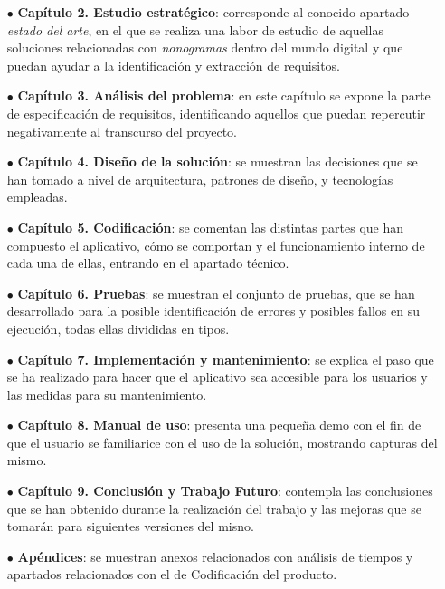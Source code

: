 \begin{itemize}
   \item[$\bullet$] \textbf{Capítulo 2. Estudio estratégico}: corresponde al conocido apartado \textit{estado del arte}, en el que se realiza una labor 
   de estudio de aquellas soluciones relacionadas con \textit{nonogramas} dentro del mundo digital y que puedan ayudar a la identificación y extracción de requisitos.
   \item[$\bullet$] \textbf{Capítulo 3. Análisis del problema}: en este capítulo se expone la parte de especificación de requisitos,
    identificando aquellos que puedan repercutir negativamente al transcurso del proyecto.
   \item[$\bullet$] \textbf{Capítulo 4. Diseño de la solución}: se muestran las decisiones que se han tomado a nivel de arquitectura, patrones de diseño, 
   y tecnologías empleadas.
   \item[$\bullet$] \textbf{Capítulo 5. Codificación}: se comentan las distintas partes que han compuesto el aplicativo, cómo se comportan y 
   el funcionamiento interno de cada una de ellas, entrando en el apartado técnico.
   \item[$\bullet$] \textbf{Capítulo 6. Pruebas}: se muestran el conjunto de pruebas, que se han desarrollado para la posible identificación de 
   errores y posibles fallos en su ejecución, todas ellas divididas en tipos. 
   \item[$\bullet$] \textbf{Capítulo 7. Implementación y mantenimiento}: se explica el paso que se ha realizado para hacer que el aplicativo sea accesible
   para los usuarios y las medidas para su mantenimiento. 
   \item[$\bullet$] \textbf{Capítulo 8. Manual de uso}: presenta una pequeña demo con el fin de que el usuario se familiarice con el uso de
   la solución, mostrando capturas del mismo.
   \item[$\bullet$] \textbf{Capítulo 9. Conclusión y Trabajo Futuro}: contempla las conclusiones que se han obtenido durante la realización del trabajo y
   las mejoras que se tomarán para siguientes versiones del misno.
   \item[$\bullet$] \textbf{Apéndices}: se muestran anexos relacionados con análisis de tiempos y apartados relacionados con el de Codificación del
   producto.
\end{itemize}